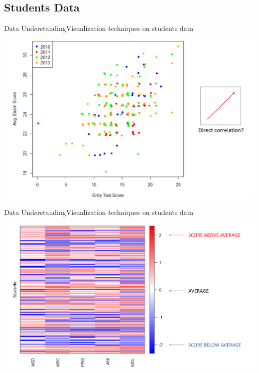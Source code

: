 \subsection{Students Data}
\begin{frame}{Data Understanding}{Visualization techniques on students data}

    \vspace{0.2cm}
    \begin{centering}
        \includegraphics[scale=0.28]{img2_noback.png}
    \end{centering}

\end{frame}

\begin{frame}{Data Understanding}{Visualization techniques on students data}

    \vspace{0.5cm}
    \noindent\begin{centering}
        \includegraphics[scale=0.25]{img3.png}
    \end{centering}

\end{frame}

